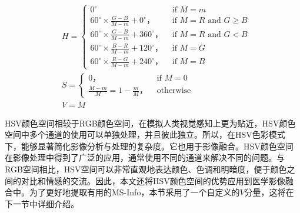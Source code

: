 \begin{equation}\label{Hcomponent}
\begin{aligned}
&H= \begin{cases}0^{\circ} & \text { if } M=m \\
60^{\circ} \times \frac{G-B}{M-m}+0^{\circ}， & \text { if } M=R \text { and } G \geq B \\
60^{\circ} \times \frac{G-B}{M-m}+360^{\circ}， & \text { if } M=R \text { and } G<B \\
60^{\circ} \times \frac{B-R}{M-m}+120^{\circ}， & \text { if } M=G \\
60^{\circ} \times \frac{R-G}{M-m}+240^{\circ}， & \text { if } M=B\end{cases} \\
&S= \begin{cases}0， & \text { if } M=0 \\
\frac{M-m}{M}=1-\frac{m}{M}， & \text { otherwise }\end{cases} \\
&V=M
\end{aligned}
\end{equation}

HSV颜色空间相较于RGB颜色空间，在模拟人类视觉感知上更为贴近\cite{jin2018multimodal}，HSV颜色空间中多个通道的使用可以单独处理，并且彼此独立。所以，在HSV色彩模式下，能够显著简化影像分析与处理的复杂度。它也用于影像融合\cite{2018Scene}。HSV颜色空间在影像处理中得到了广泛的应用，通常使用不同的通道来解决不同的问题。与RGB空间相比，HSV空间可以非常直观地表达颜色、色调和明暗度，便于颜色之间的对比和情感的交流。因此，本文还将HSV颜色空间的优势应用到医学影像融合中。为了更好地提取有用的MS-Info，本节采用了一个自定义的$V$分量，这将在下一节中详细介绍。


